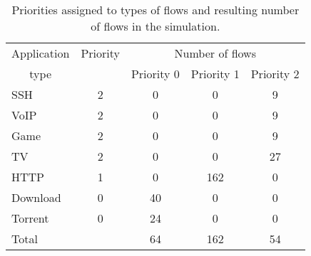 \begin{table}
	\centering
	\begin{tabular}{@{}l|cccc@{}}
		\toprule
		\multicolumn{1}{c|}{Application} & Priority & \multicolumn{3}{c}{Number of flows}  \\
		\multicolumn{1}{c|}{type}        &          & Priority 0 & Priority 1 & Priority 2 \\ \midrule
		SSH                              &    2     &     0      &     0      &     9      \\
		VoIP                             &    2     &     0      &     0      &     9      \\
		Game                             &    2     &     0      &     0      &     9      \\
		TV                               &    2     &     0      &     0      &     27     \\
		HTTP                             &    1     &     0      &    162     &     0      \\
		Download                         &    0     &     40     &     0      &     0      \\
		Torrent                          &    0     &     24     &     0      &     0      \\ \midrule
		Total                            &          &     64     &    162     &     54     \\ \bottomrule
	\end{tabular}

	\caption{Priorities assigned to types of flows and resulting number of flows in the simulation.}
	\label{tab:flows_count_A}
\end{table}